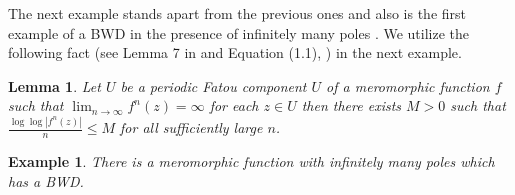 \documentclass[11pt,a4paper]{article}
\newtheorem{lemma}[theorem]{Lemma}
\newtheorem{example}{Example}[section]
\begin{document}
The next example stands apart from the previous ones and also is the first example of a BWD in the presence of infinitely many poles \cite{RipponStallard 2005(1)}. We utilize the following fact (see Lemma 7 in \cite{Berg 1993} and Equation (1.1), \cite{RipponStallard 2005(1)}) in the next example.
	\begin{lemma}
		Let $U$ be a periodic Fatou component $U$ of a meromorphic function $f$ such that $\lim_{n \to \infty}f^n (z) =\infty$ for each $z \in U$ then there exists $M>0$ such that   $\frac{\log \log |f^n(z)|}{n} \leq M$   for all sufficiently large $n$.
		\label{growth-on-periodicFC}
	\end{lemma}  
	
\begin{example}
	There is a meromorphic function with infinitely many poles which has a BWD.
	\label{BWD-infinitelymanypoles}
\end{example}
\end{document}
